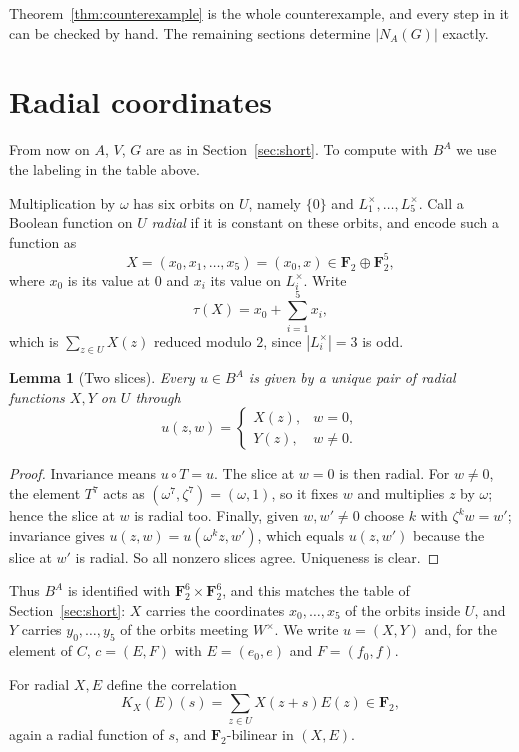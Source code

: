 \documentclass[11pt]{article}
\newtheorem{lemma}[theorem]{Lemma}
\theoremstyle{definition}
\theoremstyle{remark}
\newcommand{\F}{\mathbf F}
\begin{document}
Theorem~\ref{thm:counterexample} is the whole counterexample, and every
step in it can be checked by hand.  The remaining sections determine
$|N_A(G)|$ exactly.

\section{Radial coordinates}\label{sec:radial}

From now on $A$, $V$, $G$ are as in Section~\ref{sec:short}.  To compute
with $B^A$ we use the labeling in the table above.

Multiplication by $\omega$ has six orbits on $U$, namely $\{0\}$ and
$L_1^\times,\dots,L_5^\times$.  Call a Boolean function on $U$
\emph{radial} if it is constant on these orbits, and encode such a
function as
\[
 X=(x_0,x_1,\dots,x_5)=(x_0,x)\in\F_2\oplus\F_2^5 ,
\]
where $x_0$ is its value at $0$ and $x_i$ its value on $L_i^\times$.
Write
\[
 \tau(X)=x_0+\sum_{i=1}^5x_i ,
\]
which is $\sum_{z\in U}X(z)$ reduced modulo $2$, since $|L_i^\times|=3$
is odd.

\begin{lemma}[Two slices]\label{lem:two-slice}
Every $u\in B^A$ is given by a unique pair of radial functions $X,Y$ on
$U$ through
\[
 u(z,w)=
 \begin{cases}
 X(z),&w=0,\\
 Y(z),&w\neq0 .
 \end{cases}
\]
\end{lemma}

\begin{proof}
Invariance means $u\circ T=u$.  The slice at $w=0$ is then radial.  For
$w\neq0$, the element $T^7$ acts as $(\omega^7,\zeta^7)=(\omega,1)$,
so it fixes $w$ and multiplies $z$ by $\omega$; hence the slice at $w$
is radial too.  Finally, given $w,w'\neq0$ choose $k$ with
$\zeta^kw=w'$; invariance gives $u(z,w)=u(\omega^kz,w')$, which equals
$u(z,w')$ because the slice at $w'$ is radial.  So all nonzero slices
agree.  Uniqueness is clear.
\end{proof}

Thus $B^A$ is identified with $\F_2^6\times\F_2^6$, and this matches
the table of Section~\ref{sec:short}: $X$ carries the coordinates
$x_0,\dots,x_5$ of the orbits inside $U$, and $Y$ carries
$y_0,\dots,y_5$ of the orbits meeting $W^\times$.  We write
$u=(X,Y)$ and, for the element of $C$, $c=(E,F)$ with
$E=(e_0,e)$ and $F=(f_0,f)$.

For radial $X,E$ define the correlation
\[
 K_X(E)(s)=\sum_{z\in U}X(z+s)E(z)\in\F_2 ,
\]
again a radial function of $s$, and $\F_2$-bilinear in $(X,E)$.
\end{document}
